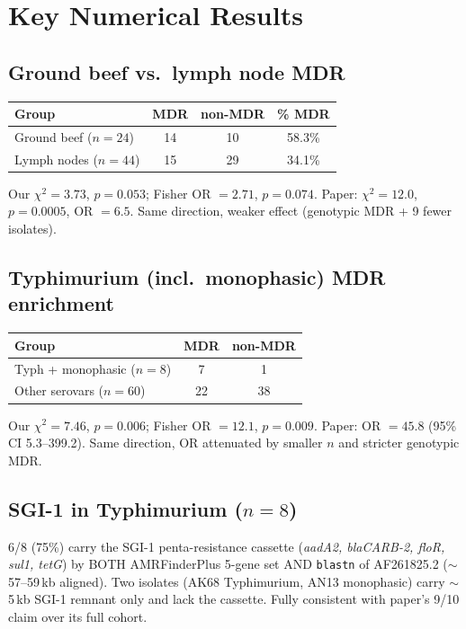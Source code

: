 \documentclass[11pt]{article}
\begin{document}
\section{Key Numerical Results}
\subsection{Ground beef vs.\ lymph node MDR}
\begin{center}
\begin{tabular}{lccc}
\toprule
Group & MDR & non-MDR & \% MDR \\
\midrule
Ground beef ($n{=}24$) & 14 & 10 & 58.3\% \\
Lymph nodes ($n{=}44$) & 15 & 29 & 34.1\% \\
\bottomrule
\end{tabular}
\end{center}
Our $\chi^2 = 3.73$, $p = 0.053$; Fisher OR $= 2.71$, $p = 0.074$. Paper: $\chi^2 = 12.0$, $p = 0.0005$, OR $= 6.5$. Same direction, weaker effect (genotypic MDR + 9 fewer isolates).

\subsection{Typhimurium (incl.\ monophasic) MDR enrichment}
\begin{center}
\begin{tabular}{lcc}
\toprule
Group & MDR & non-MDR \\
\midrule
Typh + monophasic ($n{=}8$) & 7 & 1 \\
Other serovars ($n{=}60$) & 22 & 38 \\
\bottomrule
\end{tabular}
\end{center}
Our $\chi^2 = 7.46$, $p = 0.006$; Fisher OR $= 12.1$, $p = 0.009$. Paper: OR $= 45.8$ (95\% CI 5.3--399.2). Same direction, OR attenuated by smaller $n$ and stricter genotypic MDR.

\subsection{SGI-1 in Typhimurium ($n{=}8$)}
6/8 (75\%) carry the SGI-1 penta-resistance cassette (\emph{aadA2, blaCARB-2, floR, sul1, tetG}) by BOTH AMRFinderPlus 5-gene set AND \texttt{blastn} of AF261825.2 ($\sim$57--59\,kb aligned). Two isolates (AK68 Typhimurium, AN13 monophasic) carry $\sim$5\,kb SGI-1 remnant only and lack the cassette. Fully consistent with paper's 9/10 claim over its full cohort.
\end{document}
